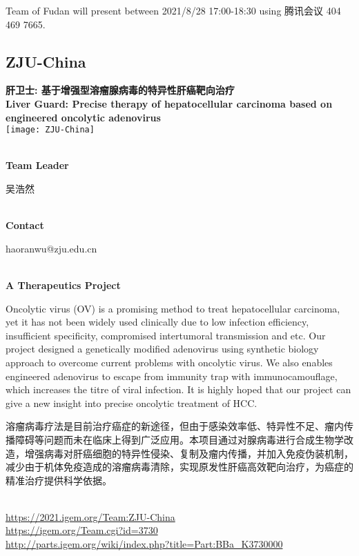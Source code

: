 Team of Fudan will present between        2021/8/28 17:00-18:30 using 腾讯会议 404 469 7665.
\newpage


\subsection{\textcolor{Blu}{ ZJU-China } }
\vspace{5mm}
\begin{center}
\large{
  \textbf{ 肝卫士: 基于增强型溶瘤腺病毒的特异性肝癌靶向治疗\\ Liver Guard: Precise therapy of hepatocellular carcinoma based on engineered oncolytic adenovirus }\\

  \texttt{[image: ZJU-China]}
}
\end{center}
\textbf{\\Team Leader}

  吴浩然


\textbf{\\Contact}

  haoranwu@zju.edu.cn


\textbf{\\A Therapeutics Project\\}\begin{spacing}{1.5}

Oncolytic virus (OV) is a promising method to treat hepatocellular carcinoma, yet it has not been widely used clinically due to low infection efficiency, insufficient specificity, compromised intertumoral transmission and etc. Our project designed a genetically modified adenovirus using synthetic biology approach to overcome current problems with oncolytic virus. We also enables engineered adenovirus to escape from immunity trap with immunocamouflage, which increases the titre of viral infection. It is highly hoped that our project can give a new insight into precise oncolytic treatment of HCC.

溶瘤病毒疗法是目前治疗癌症的新途径，但由于感染效率低、特异性不足、瘤内传播障碍等问题而未在临床上得到广泛应用。本项目通过对腺病毒进行合成生物学改造，增强病毒对肝癌细胞的特异性侵染、复制及瘤内传播，并加入免疫伪装机制，减少由于机体免疫造成的溶瘤病毒清除，实现原发性肝癌高效靶向治疗，为癌症的精准治疗提供科学依据。\end{spacing}
\\

\url{https://2021.igem.org/Team:ZJU-China }\\
\url{https://igem.org/Team.cgi?id=3730 }\\
\url{http://parts.igem.org/wiki/index.php?title=Part:BBa_K3730000 }\\


